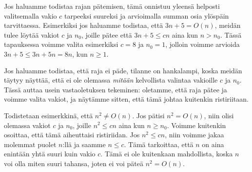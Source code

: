 Jos haluamme todistaa rajan pätemisen,
tämä onnistuu yleensä helposti valitsemalla vakio $c$
tarpeeksi suureksi ja arvioimalla summan osia ylöspäin tarvittaessa.
Esimerkiksi jos haluamme todistaa, että $3n+5 = O(n)$, meidän tulee löytää
vakiot $c$ ja $n_0$, joille pätee että $3n+5 \le cn$ aina kun $n>n_0$.
Tässä tapauksessa voimme valita esimerkiksi $c=8$ ja $n_0=1$,
jolloin voimme arvioida $3n+5 \le 3n+5n=8n$, kun $n \ge 1$.

Jos haluamme todistaa, että raja ei päde, tilanne on hankalampi,
koska meidän täytyy näyttää, että ei ole olemassa \emph{mitään} kelvollista
valintaa vakioille $c$ ja $n_0$.
Tässä auttaa usein vastaoletuksen tekeminen: oletamme,
että raja pätee ja voimme valita vakiot,
ja näytämme sitten, että tämä johtaa kuitenkin ristiriitaan.

Todistetaan esimerkkinä, että $n^2 \neq O(n)$.
Jos pätisi $n^2=O(n)$, niin olisi olemassa vakiot $c$ ja $n_0$,
joille $n^2 \le cn$ aina kun $n \ge n_0$.
Voimme kuitenkin osoittaa, että tämä aiheuttaisi ristiriidan.
Jos $n^2 \le cn$, niin voimme jakaa molemmat puolet $n$:llä
ja saamme $n \le c$.
Tämä tarkoittaa, että $n$ on aina enintään yhtä suuri kuin vakio $c$.
Tämä ei ole kuitenkaan mahdollista, koska $n$ voi olla miten
suuri tahansa, joten ei voi päteä $n^2 = O(n)$.